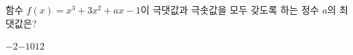 함수 $f(x)=x^3+3x^2+ax-1$이 극댓값과 극솟값을 모두 갖도록 하는 정수 $a$의 최댓값은?
\begin{choices32}{$-2$}{$-1$}{$0$}{$1$}{$2$}\end{choices32}
